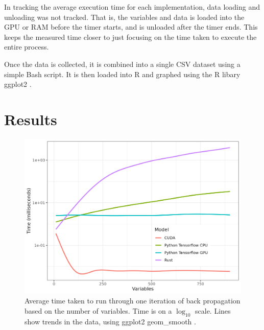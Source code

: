 \documentclass[12pt]{article}
\begin{document}
In tracking the average execution time for each implementation, data loading and unloading was not tracked.
That is, the variables and data is loaded into the GPU or RAM before the timer starts, and is unloaded after the timer ends.
This keeps the measured time closer to just focusing on the time taken to execute the entire process.

Once the data is collected, it is combined into a single CSV dataset using a simple Bash script.
It is then loaded into R \cite{lang_r} and graphed using the R libary ggplot2 \cite{lib_ggplot2}.

\section{Results}

\begin{figure}
	\begin{center}
		\includegraphics[width=0.9\linewidth]{variables.png}
	\end{center}
	\caption{Average time taken to run through one iteration of back propagation based on the number of variables. Time is on a $\log_{10}$ scale. Lines show trends in the data, using ggplot2 geom\_smooth \cite{lib_ggplot2}.}
	\label{fig:graph:variables}
\end{figure}
\end{document}
